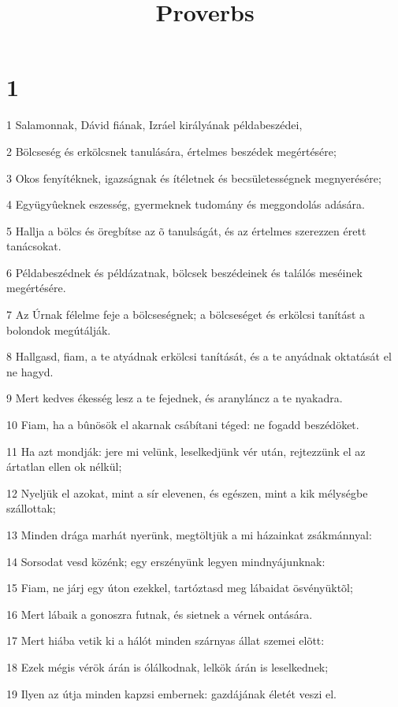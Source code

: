 

\title{Proverbs}


\chapter{1}

\par 1 Salamonnak, Dávid fiának, Izráel királyának példabeszédei,
\par 2 Bölcseség és erkölcsnek tanulására, értelmes beszédek megértésére;
\par 3 Okos fenyítéknek, igazságnak és ítéletnek és becsületességnek megnyerésére;
\par 4 Együgyûeknek eszesség, gyermeknek tudomány és meggondolás adására.
\par 5 Hallja a bölcs és öregbítse az õ tanulságát, és az értelmes szerezzen érett tanácsokat.
\par 6 Példabeszédnek és példázatnak, bölcsek beszédeinek és találós meséinek megértésére.
\par 7 Az Úrnak félelme feje a bölcseségnek; a bölcseséget és erkölcsi tanítást a bolondok megútálják.
\par 8 Hallgasd, fiam, a te atyádnak erkölcsi tanítását, és a te anyádnak oktatását el ne hagyd.
\par 9 Mert kedves ékesség lesz a te fejednek, és aranyláncz a te nyakadra.
\par 10 Fiam, ha a bûnösök el akarnak csábítani téged: ne fogadd beszédöket.
\par 11 Ha azt mondják: jere mi velünk, leselkedjünk vér után, rejtezzünk el az ártatlan ellen ok nélkül;
\par 12 Nyeljük el azokat, mint a sír elevenen, és egészen, mint a kik mélységbe szállottak;
\par 13 Minden drága marhát nyerünk, megtöltjük a mi házainkat zsákmánnyal:
\par 14 Sorsodat vesd közénk; egy erszényünk legyen mindnyájunknak:
\par 15 Fiam, ne járj egy úton ezekkel, tartóztasd meg lábaidat ösvényüktõl;
\par 16 Mert lábaik a gonoszra futnak, és sietnek a vérnek ontására.
\par 17 Mert hiába vetik ki a hálót minden szárnyas állat szemei elõtt:
\par 18 Ezek mégis vérök árán is ólálkodnak, lelkök árán is leselkednek;
\par 19 Ilyen az útja minden kapzsi embernek: gazdájának életét veszi el.

